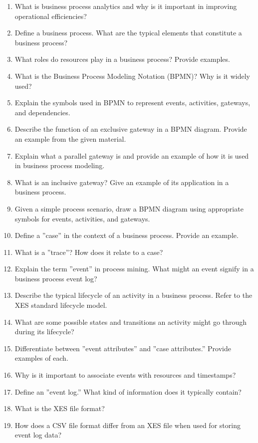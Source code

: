 \begin{enumerate}[nosep]
    \item What is business process analytics and why is it important in improving operational efficiencies?
    \item Define a business process. What are the typical elements that constitute a business process?
    \item What roles do resources play in a business process? Provide examples.
    \item What is the Business Process Modeling Notation (BPMN)? Why is it widely used?
    \item Explain the symbols used in BPMN to represent events, activities, gateways, and dependencies.
    \item Describe the function of an exclusive gateway in a BPMN diagram. Provide an example from the given material.
    \item Explain what a parallel gateway is and provide an example of how it is used in business process modeling.
    \item What is an inclusive gateway? Give an example of its application in a business process.
    \item Given a simple process scenario, draw a BPMN diagram using appropriate symbols for events, activities, and gateways.
    \item Define a ''case'' in the context of a business process. Provide an example.
    \item What is a ''trace''? How does it relate to a case?
    \item Explain the term ''event'' in process mining. What might an event signify in a business process event log?
    \item Describe the typical lifecycle of an activity in a business process. Refer to the XES standard lifecycle model.
    \item What are some possible states and transitions an activity might go through during its lifecycle?
    \item Differentiate between ''event attributes'' and ''case attributes.'' Provide examples of each.
    \item Why is it important to associate events with resources and timestamps?
    \item Define an ''event log.'' What kind of information does it typically contain?
    \item What is the XES file format?
    \item How does a CSV file format differ from an XES file when used for storing event log data?

\end{enumerate}
